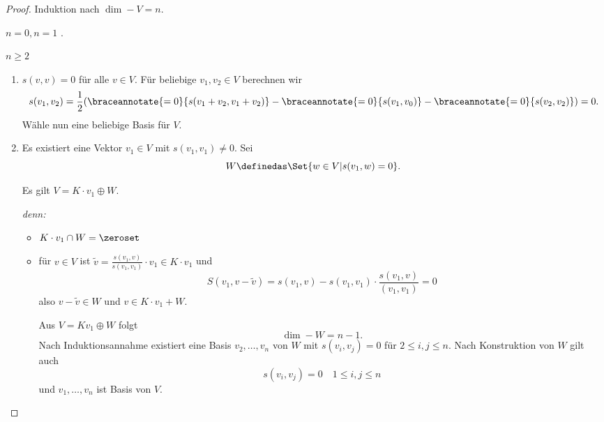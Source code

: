 \begin{proof}
  Induktion nach \( \dim-{V}=n \).
  \begin{proofdescription}
    \item[\( n=0, n=1 \)] \checkmark.
    \item[\( n\geq 2 \)] \begin{enumerate}[label=Fall \rechtsklammer{\alph*}]
      \item \( s(v,v)=0 \) für alle \( v\in V \). Für beliebige \( v_1,v_2\in V \) berechnen wir
      \begin{equation*}
        s(v_1,v_2)=\frac{1}{2}(\braceannotate{=0}{s(v_1+v_2,v_1+v_2)}-\braceannotate{=0}{s(v_1,v_0)}-\braceannotate{=0}{s(v_2,v_2)})=0.
      \end{equation*}
      Wähle nun eine beliebige Basis für \( V \).
      \item Es existiert eine Vektor \( v_1\in V \) mit \( s(v_1,v_1)\neq 0 \). Sei 
      \begin{equation*}
        W\definedas \Set{w\in V|s(v_1,w)=0}.
      \end{equation*}
      \begin{behauptung}
        Es gilt \( V=K\cdot v_1\oplus W \).
      \end{behauptung}
      \emph{denn:} \begin{itemize}
        \item \( K\cdot v_1\cap W=\zeroset \)
        \item für \( v\in V \) ist \( \tilde{v}=\frac{s(v_1,v)}{s(v_1,v_1)}\cdot v_1\in K\cdot v_1 \) und
        \begin{equation*}
          S(v_1,v-\tilde{v})=s(v_1,v)-s(v_1,v_1)\cdot\frac{s(v_1,v)}{(v_1,v_1)}=0
        \end{equation*}
        also \( v-\tilde{v}\in W \) und \( v\in K\cdot v_1+W \).

        Aus \( V=K v_1\oplus W \) folgt
        \begin{equation*}
          \dim-{W}=n-1.
        \end{equation*}
        Nach Induktionsannahme existiert eine Basis \( v_2,\dotsc,v_n \) von \( W \) mit \( s(v_i,v_j)=0 \) für \( 2\leq i,j\leq n \). Nach Konstruktion von \( W \) gilt auch
        \begin{equation*}
          s(v_i,v_j)=0\quad 1\leq i,j\leq n
        \end{equation*}
        und \( v_1,\dotsc,v_n \) ist Basis von \( V \).
      \end{itemize}
    \end{enumerate} 
  \end{proofdescription}
  
\end{proof}